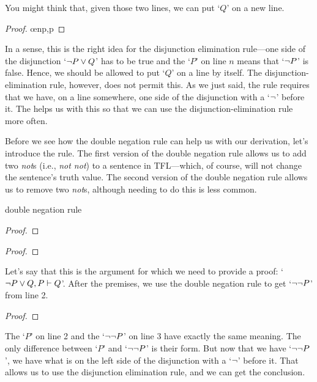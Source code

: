 You might think that, given those two lines, we can put `$Q$' on a new line.
\begin{proof}
	 \oe{np,p}
\end{proof}
In a sense, this is the right idea for the disjunction elimination rule---one side of the disjunction `${\neg} P \vee Q$' has to be true and the `$P$' on line $n$ means that `${\neg} P$' is false. Hence, we should be allowed to put `$Q$' on a line by itself. The disjunction-elimination rule, however, does not permit this. As we just said, the rule requires that we have, on a line somewhere, one side of the disjunction with a `${\neg}$' before it. The  helps us with this so that we can use the disjunction-elimination rule more often. 

Before we see how the double negation rule can help us with our derivation, let's introduce the rule. The first version of the double negation rule allows us to add two \textit{not}s (i.e., \textit{not not}) to a sentence in TFL---which, of course, will not change the sentence's truth value. The second version of the double negation rule allows us to remove two \textit{not}s, although needing to do this is less common.

\begin{factboxy}{double negation rule}
\begin{proof}
	 
\end{proof}

\begin{proof}
	 
\end{proof}
\end{factboxy}

Let's say that this is the argument for which we need to provide a proof: `${\neg} P \vee Q, P \vdash Q$'. After the premises, we use the double negation rule to get `${\neg} {\neg} P$' from line 2.

\begin{proof}
	 \pr{}
	 \pr{} 
	 
\end{proof}

The `$P$' on line 2 and the `${\neg} {\neg} P$' on line 3 have exactly the same meaning. The only difference between `$P$' and `${\neg} {\neg} P$' is their form. But now that we have `${\neg} {\neg} P$', we have what is on the left side of the disjunction with a `${\neg}$' before it. That allows us to use the disjunction elimination rule, and we can get the conclusion.

